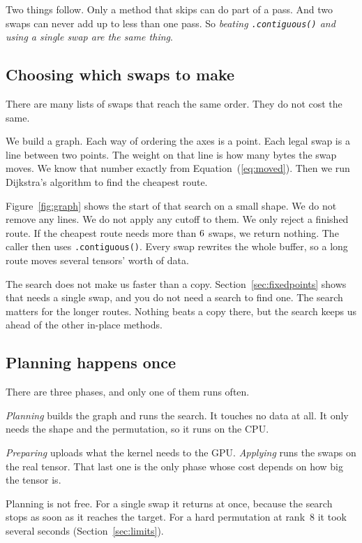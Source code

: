 Two things follow. Only a method that skips can do part of a pass. And two
swaps can never add up to less than one pass. So \emph{beating
\texttt{.contiguous()} and using a single swap are the same thing}.

\subsection{Choosing which swaps to make}
\label{sec:planning}

There are many lists of swaps that reach the same order. They do not cost the
same.

We build a graph. Each way of ordering the axes is a point. Each legal swap is
a line between two points. The weight on that line is how many bytes the swap
moves. We know that number exactly from Equation~(\ref{eq:moved}). Then we run
Dijkstra's algorithm to find the cheapest route.



Figure~\ref{fig:graph} shows the start of that search on a small shape. We do
not remove any lines. We do not apply any cutoff to them. We only reject
a finished route. If the cheapest route needs more than $6$ swaps,
we return nothing. The caller then uses \texttt{.contiguous()}. Every swap
rewrites the whole buffer, so a long route moves several tensors' worth of data.

The search does not make us faster than a copy. Section~\ref{sec:fixedpoints}
shows that needs a single swap, and you do not need a search to find one. The
search matters for the longer routes. Nothing beats a copy there, but the
search keeps us ahead of the other in-place methods.

\subsection{Planning happens once}
\label{sec:cache}

There are three phases, and only one of them runs often.

\emph{Planning} builds the graph and runs the search. It touches no data at
all. It only needs the shape and the permutation, so it runs on the CPU.

\emph{Preparing} uploads what the kernel needs to the GPU. \emph{Applying}
runs the swaps on the real tensor. That last one is the only phase whose cost
depends on how big the tensor is.

Planning is not free. For a single swap it returns at once, because the search
stops as soon as it reaches the target. For a hard permutation at rank~8 it
took several seconds (Section~\ref{sec:limits}).


